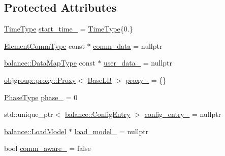 \subsection*{Protected Attributes}
\begin{DoxyCompactItemize}
\item 
\hyperlink{namespacevt_a2b9f28078dc309ad0706b69ded743e69}{Time\+Type} \hyperlink{structvt_1_1vrt_1_1collection_1_1lb_1_1_base_l_b_a5df60167861bf4058c72f02f3fd39fd8}{start\+\_\+time\+\_\+} = \hyperlink{namespacevt_a2b9f28078dc309ad0706b69ded743e69}{Time\+Type}\{0.\}
\item 
\hyperlink{structvt_1_1vrt_1_1collection_1_1lb_1_1_base_l_b_a83eb4daec14edfb8780422e95b8e38d3}{Element\+Comm\+Type} const  $\ast$ \hyperlink{structvt_1_1vrt_1_1collection_1_1lb_1_1_base_l_b_a8d519b94ce4741da7049cb2b7b513963}{comm\+\_\+data} = nullptr
\item 
\hyperlink{namespacevt_1_1vrt_1_1collection_1_1balance_a5794b6bc763c88c78228074bd0d1a50f}{balance\+::\+Data\+Map\+Type} const  $\ast$ \hyperlink{structvt_1_1vrt_1_1collection_1_1lb_1_1_base_l_b_af9852e3a0504ffd474a7ebad1ee1a052}{user\+\_\+data\+\_\+} = nullptr
\item 
\hyperlink{structvt_1_1objgroup_1_1proxy_1_1_proxy}{objgroup\+::proxy\+::\+Proxy}$<$ \hyperlink{structvt_1_1vrt_1_1collection_1_1lb_1_1_base_l_b}{Base\+LB} $>$ \hyperlink{structvt_1_1vrt_1_1collection_1_1lb_1_1_base_l_b_ab5cfe4d0cb73397c5ffe937f119bc71a}{proxy\+\_\+} = \{\}
\item 
\hyperlink{namespacevt_a46ce6733d5cdbd735d561b7b4029f6d7}{Phase\+Type} \hyperlink{structvt_1_1vrt_1_1collection_1_1lb_1_1_base_l_b_a9bb7a04d3ef1012c95322d8375593498}{phase\+\_\+} = 0
\item 
std\+::unique\+\_\+ptr$<$ \hyperlink{structvt_1_1vrt_1_1collection_1_1balance_1_1_config_entry}{balance\+::\+Config\+Entry} $>$ \hyperlink{structvt_1_1vrt_1_1collection_1_1lb_1_1_base_l_b_aab09edd9a749b42a32c5de15001e7774}{config\+\_\+entry\+\_\+} = nullptr
\item 
\hyperlink{structvt_1_1vrt_1_1collection_1_1balance_1_1_load_model}{balance\+::\+Load\+Model} $\ast$ \hyperlink{structvt_1_1vrt_1_1collection_1_1lb_1_1_base_l_b_ae6cd8bdf27d81dc55f9eec9038b347dc}{load\+\_\+model\+\_\+} = nullptr
\item 
bool \hyperlink{structvt_1_1vrt_1_1collection_1_1lb_1_1_base_l_b_a0b7eb81cc499a7cd7c1a6fd1f6a3c8fe}{comm\+\_\+aware\+\_\+} = false
\end{DoxyCompactItemize}
